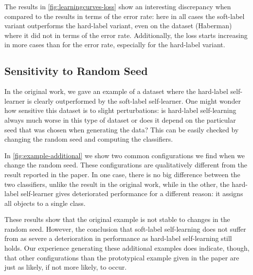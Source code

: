 \documentclass[twoside]{memoir}\usepackage[]{graphicx}\usepackage{xcolor}
\begin{document}
The results in \cref{fig:learningcurves-loss} show an interesting discrepancy when compared to the results in terms of the error rate: here in all cases the soft-label variant outperforms the hard-label variant, even on the dataset (Haberman) where it did not in terms of the error rate. Additionally, the loss starts increasing in more cases than for the error rate, especially for the hard-label variant.

\subsection{Sensitivity to Random Seed}
In the original work, we gave an example of a dataset where the hard-label self-learner is clearly outperformed by the soft-label self-learner. One might wonder how sensitive this dataset is to slight perturbations: is hard-label self-learning always much worse in this type of dataset or does it depend on the particular seed that was chosen when generating the data? This can be easily checked by changing the random seed and computing the classifiers. 

In \cref{fig:example-additional} we show two common configurations we find when we change the random seed. These configurations are qualitatively different from the result reported in the paper. In one case, there is no big difference between the two classifiers, unlike the result in the original work, while in the other, the hard-label self-learner gives deteriorated performance for a different reason: it assigns all objects to a single class. 

These results show that the original example is not stable to changes in the random seed. However, the conclusion that soft-label self-learning does not suffer from as severe a deterioration in performance as hard-label self-learning still holds. Our experience generating these additional examples does indicate, though, that other configurations than the prototypical example given in the paper are just as likely, if not more likely, to occur.
\end{document}
